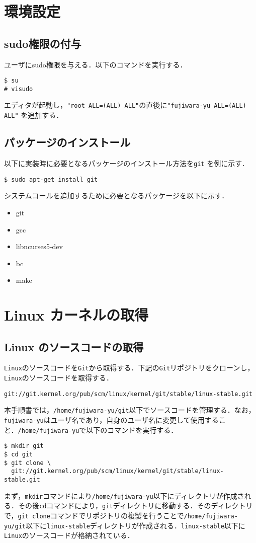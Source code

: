 \documentclass[12pt]{jsarticle}
\begin{document}
\section{環境設定}\label{sec:config}
\subsection{sudo権限の付与}
ユーザにsudo権限を与える．以下のコマンドを実行する．
\begin{verbatim}
$ su
# visudo
\end{verbatim}
エディタが起動し，\verb|"root ALL=(ALL) ALL"|の直後に\verb|"fujiwara-yu ALL=(ALL) ALL"| を追加する．

\subsection{パッケージのインストール}
以下に実装時に必要となるパッケージのインストール方法を\verb|git| を例に示す．
\begin{verbatim}
$ sudo apt-get install git
\end{verbatim}
システムコールを追加するために必要となるパッケージを以下に示す．
\begin{itemize}
\item git
\item gcc
\item libncurses5-dev
\item bc
\item make
\end{itemize}

\section{Linux カーネルの取得}\label{sec:kernel}
\subsection{Linux のソースコードの取得}
\verb|Linux|のソースコードを\verb|Git|から取得する．下記の\verb|Git|リポジトリをクローンし，\verb|Linux|のソースコードを取得する．
\begin{verbatim}
git://git.kernel.org/pub/scm/linux/kernel/git/stable/linux-stable.git
\end{verbatim}
本手順書では，\verb|/home/fujiwara-yu/git|以下でソースコードを管理する．なお，\verb|fujiwara-yu|はユーザ名であり，自身のユーザ名に変更して使用すること．\verb|/home/fujiwara-yu|で以下のコマンドを実行する．
\begin{verbatim}
$ mkdir git
$ cd git
$ git clone \ 
  git://git.kernel.org/pub/scm/linux/kernel/git/stable/linux-stable.git
\end{verbatim}
まず，\verb|mkdir|コマンドにより\verb|/home/fujiwara-yu|以下にディレクトリが作成される．その後\verb|cd|コマンドにより，\verb|git|ディレクトリに移動する．そのディレクトリで，\verb|git clone|コマンドでリポジトリの複製を行うことで\verb|/home/fujiwara-yu/git|以下に\verb|linux-stable|ディレクトリが作成される．\verb|linux-stable|以下に\verb|Linux|のソースコードが格納されている．
\end{document}
